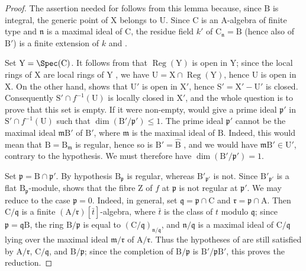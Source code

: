 \begin{proof}
The assertion needed for  follows from this lemma because, since $\mathrm{B}$ is integral, the generic point of $\mathrm{X}$ belongs to $\mathrm{U}$.
Since $\mathrm{C}$ is an $\mathrm{A}$-algebra of finite type and $\mathfrak{n}$ is a maximal ideal of $\mathrm{C}$, the residue field $k'$ of $\mathrm{C}_\mathfrak{n}=\mathrm{B}$ (hence also of $\mathrm{B}'$) is a finite extension of $k$  and .

Set $\mathrm{Y}=\Spec(\mathrm{C})$. It follows from  that $\operatorname{Reg}(\mathrm{Y})$ is open in $\mathrm{Y}$; since the local rings of $\mathrm{X}$ are local rings of $\mathrm{Y}$ , we have $\mathrm{U}=\mathrm{X}\cap\operatorname{Reg}(\mathrm{Y})$, hence $\mathrm{U}$ is open in $\mathrm{X}$. On the other hand,  shows that $\mathrm{U}'$ is open in $\mathrm{X}'$, hence $\mathrm{S}'=\mathrm{X}'-\mathrm{U}'$ is closed. Consequently $\mathrm{S}'\cap f^{-1}(\mathrm{U})$ is locally closed in $\mathrm{X}'$, and the whole question is to prove that this set is empty.
If it were non-empty,  would give a prime ideal $\mathfrak{p}'$ in $\mathrm{S}'\cap f^{-1}(\mathrm{U})$ such that $\dim(\mathrm{B}'/\mathfrak{p}')\leqslant 1$.
The prime ideal $\mathfrak{p}'$ cannot be the maximal ideal $\mathfrak{m}\mathrm{B}'$ of $\mathrm{B}'$, where $\mathfrak{m}$ is the maximal ideal of $\mathrm{B}$. Indeed, this would mean that $\mathrm{B}=\mathrm{B}_\mathfrak{m}$ is regular, hence so is $\mathrm{B}'=\widehat{\mathrm{B}}$ , and we would have $\mathfrak{m}\mathrm{B}'\in\mathrm{U}'$, contrary to the hypothesis. We must therefore have $\dim(\mathrm{B}'/\mathfrak{p}')=1$.

Set $\mathfrak{p}=\mathrm{B}\cap\mathfrak{p}'$. By hypothesis $\mathrm{B}_\mathfrak{p}$ is regular, whereas $\mathrm{B}'_{\mathfrak{p}'}$ is not. Since $\mathrm{B}'_{\mathfrak{p}'}$ is a flat $\mathrm{B}_\mathfrak{p}$-module,  shows that the fibre $\mathrm{Z}$ of $f$ at $\mathfrak{p}$ is not regular at $\mathfrak{p}'$.
We may reduce to the case $\mathfrak{p}=0$. Indeed, in general, set $\mathfrak{q}=\mathfrak{p}\cap\mathrm{C}$ and $\mathfrak{r}=\mathfrak{p}\cap\mathrm{A}$. Then $\mathrm{C}/\mathfrak{q}$ is a finite $(\mathrm{A}/\mathfrak{r})[\bar{t}]$-algebra, where $\bar{t}$ is the class of $t$ modulo $\mathfrak{q}$; since $\mathfrak{p}=\mathfrak{q}\mathrm{B}$, the ring $\mathrm{B}/\mathfrak{p}$ is equal to $(\mathrm{C}/\mathfrak{q})_{\mathfrak{n}/\mathfrak{q}}$, and $\mathfrak{n}/\mathfrak{q}$ is a maximal ideal of $\mathrm{C}/\mathfrak{q}$ lying over the maximal ideal $\mathfrak{m}/\mathfrak{r}$ of $\mathrm{A}/\mathfrak{r}$. Thus the hypotheses of  are still satisfied by $\mathrm{A}/\mathfrak{r}$, $\mathrm{C}/\mathfrak{q}$, and $\mathrm{B}/\mathfrak{p}$; since the completion of $\mathrm{B}/\mathfrak{p}$ is $\mathrm{B}'/\mathfrak{p}\mathrm{B}'$, this proves the reduction.


\end{proof}
